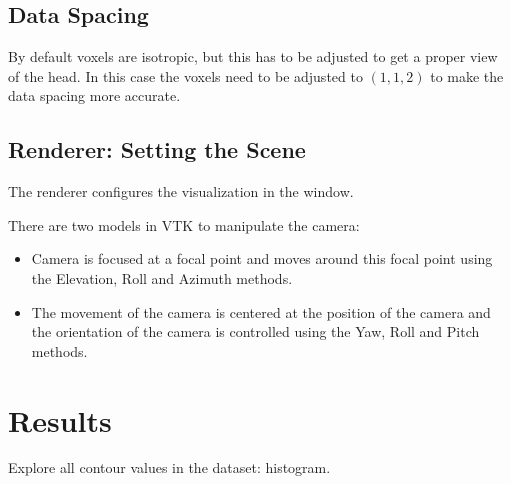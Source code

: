 \documentclass{article}
\begin{document}
\subsection{Data Spacing}
By default voxels are isotropic, but this has to be adjusted to get a proper view of the head. In this case the voxels need to be adjusted to $(1,1,2)$ to make the data spacing more accurate.


\subsection{Renderer: Setting the Scene}
The renderer configures the visualization in the window. 

There are two models in VTK to manipulate the camera:
\begin{itemize}
\item Camera is focused at a focal point and moves around this focal point using the Elevation, Roll and Azimuth methods.
\item The movement of the camera is centered at the position of the camera and the orientation of the camera is controlled using the Yaw, Roll and Pitch methods.
\end{itemize}


\section{Results}
Explore all contour values in the dataset: histogram. 
\end{document}
